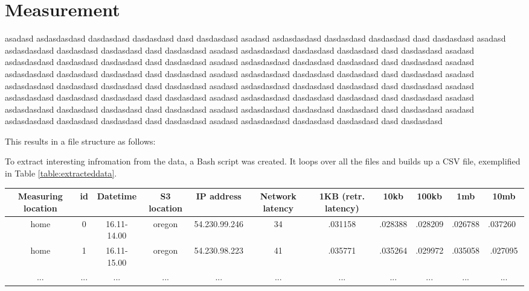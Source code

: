 \documentclass[conference]{IEEEtran}
\begin{document}
\section{Measurement}
asadasd asdasdasdasd dasdasdasd dasdasdasd dasd dasdasdasd asadasd asdasdasdasd dasdasdasd dasdasdasd dasd dasdasdasd asadasd asdasdasdasd dasdasdasd dasdasdasd dasd dasdasdasd asadasd asdasdasdasd dasdasdasd dasdasdasd dasd dasdasdasd asadasd asdasdasdasd dasdasdasd dasdasdasd dasd dasdasdasd asadasd asdasdasdasd dasdasdasd dasdasdasd dasd dasdasdasd asadasd asdasdasdasd dasdasdasd dasdasdasd dasd dasdasdasd asadasd asdasdasdasd dasdasdasd dasdasdasd dasd dasdasdasd asadasd asdasdasdasd dasdasdasd dasdasdasd dasd dasdasdasd asadasd asdasdasdasd dasdasdasd dasdasdasd dasd dasdasdasd asadasd asdasdasdasd dasdasdasd dasdasdasd dasd dasdasdasd asadasd asdasdasdasd dasdasdasd dasdasdasd dasd dasdasdasd asadasd asdasdasdasd dasdasdasd dasdasdasd dasd dasdasdasd asadasd asdasdasdasd dasdasdasd dasdasdasd dasd dasdasdasd asadasd asdasdasdasd dasdasdasd dasdasdasd dasd dasdasdasd asadasd asdasdasdasd dasdasdasd dasdasdasd dasd dasdasdasd

This results in a file structure as follows:\\

To extract interesting infromation from the data, a Bash script was created. It loops over all the files and builds up a CSV file, exemplified in Table \ref{table:extracteddata}.

\begin{table*}
\renewcommand{\arraystretch}{1.3}
\caption{Extracted data}
\centering
\begin{tabular}{|c|c|c|c|c|c|c|c|c|c|c|}
\hline
\bfseries Measuring location & \bfseries id & \bfseries Datetime & \bfseries S3 location & \bfseries IP address & \bfseries Network latency & \bfseries 1KB (retr. latency) & \bfseries 10kb & \bfseries 100kb & \bfseries 1mb & \bfseries 10mb \\
\hline\hline
home & 0 & 16.11-14.00 & oregon & 54.230.99.246 & 34 & .031158 & .028388 & .028209 & .026788 & .037260 \\
\hline
home & 1 & 16.11-15.00 & oregon & 54.230.98.223 & 41 & .035771 & .035264 & .029972 & .035058 & .027095 \\
\hline
... & ... & ... & ... & ... & ... & ... & ... & ... & ... & ... \\
\hline
\end{tabular}
\label{table:extracteddata}
\end{table*}
\end{document}
